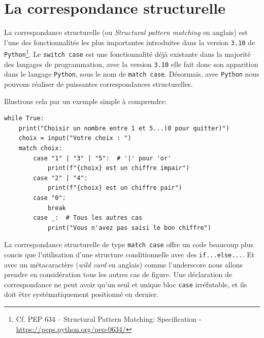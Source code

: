 \documentclass[a4paper,12pt]{book}
\begin{document}
\section{La correspondance structurelle}\label{correspondance_structurelle}
La correspondance structurelle (ou \textit{Structural pattern matching} en anglais) est l'une des fonctionnalités les plus importantes introduites dans la version \texttt{3.10} de \texttt{Python}\footnote{Cf. PEP 634 – Structural Pattern Matching: Specification - \url{https://peps.python.org/pep-0634/}}. Le \texttt{switch case} est une fonctionnalité déjà existante dans la majorité des langages de programmation, avec la version \texttt{3.10} elle fait donc son apparition dans le langage \texttt{Python}, sous le nom de \texttt{match case}. Désormais, avec \texttt{Python} nous pouvons réaliser de puissantes correspondances structurelles.
\medskip

Illustrons cela par un exemple simple à comprendre:
\begin{lstlisting}
while True:
    print("Choisir un nombre entre 1 et 5...(0 pour quitter)")
    choix = input("Votre choix : ")
    match choix:
        case "1" | "3" | "5":  # '|' pour 'or'
            print(f"{choix} est un chiffre impair")
        case "2" | "4":
            print(f"{choix} est un chiffre pair")
        case "0":
            break
        case _:  # Tous les autres cas
            print("Vous n'avez pas saisi le bon chiffre")
\end{lstlisting}
\medskip

La correspondance structurelle de type \texttt{match case} offre un code beaucoup plus concis que l'utilisation d'une structure conditionnelle avec des \texttt{if...else...}. Et avec un métacaractère (\textit{wild card} en anglais) comme l'underscore nous allons prendre en considération tous les autres cas de figure. Une déclaration de correspondance ne peut avoir qu'un seul et unique bloc \texttt{case} irréfutable, et ils doit être systématiquement positionné en dernier.
\medskip
\end{document}
